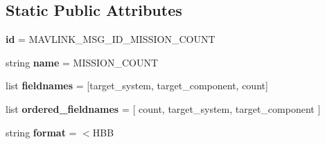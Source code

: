 \subsection*{Static Public Attributes}
\begin{DoxyCompactItemize}
\item 
\mbox{\label{classpymavlink_1_1dialects_1_1v10_1_1MAVLink__mission__count__message_a12a6b41739d4b2e0484741760f7ce44c}} 
{\bfseries id} = M\+A\+V\+L\+I\+N\+K\+\_\+\+M\+S\+G\+\_\+\+I\+D\+\_\+\+M\+I\+S\+S\+I\+O\+N\+\_\+\+C\+O\+U\+NT
\item 
\mbox{\label{classpymavlink_1_1dialects_1_1v10_1_1MAVLink__mission__count__message_aac7cae9d5e774b8b58d9c743830b480b}} 
string {\bfseries name} = \textquotesingle{}M\+I\+S\+S\+I\+O\+N\+\_\+\+C\+O\+U\+NT\textquotesingle{}
\item 
\mbox{\label{classpymavlink_1_1dialects_1_1v10_1_1MAVLink__mission__count__message_a7ad95c9e8d4e935bd3fa4129d44278e2}} 
list {\bfseries fieldnames} = \mbox{[}\textquotesingle{}target\+\_\+system\textquotesingle{}, \textquotesingle{}target\+\_\+component\textquotesingle{}, \textquotesingle{}count\textquotesingle{}\mbox{]}
\item 
\mbox{\label{classpymavlink_1_1dialects_1_1v10_1_1MAVLink__mission__count__message_a0a6a0608bb9f7ddfeaa6a9ba5337e4d2}} 
list {\bfseries ordered\+\_\+fieldnames} = \mbox{[} \textquotesingle{}count\textquotesingle{}, \textquotesingle{}target\+\_\+system\textquotesingle{}, \textquotesingle{}target\+\_\+component\textquotesingle{} \mbox{]}
\item 
\mbox{\label{classpymavlink_1_1dialects_1_1v10_1_1MAVLink__mission__count__message_a226e9bbd7ec7b981917817f0c98913b7}} 
string {\bfseries format} = \textquotesingle{}$<$H\+BB\textquotesingle{}
\item 
\mbox{\label{classpymavlink_1_1dialects_1_1v10_1_1MAVLink__mission__count__message_af4b15af7a154fb65b107468b70e64d81}} 

\end{DoxyCompactItemize}
